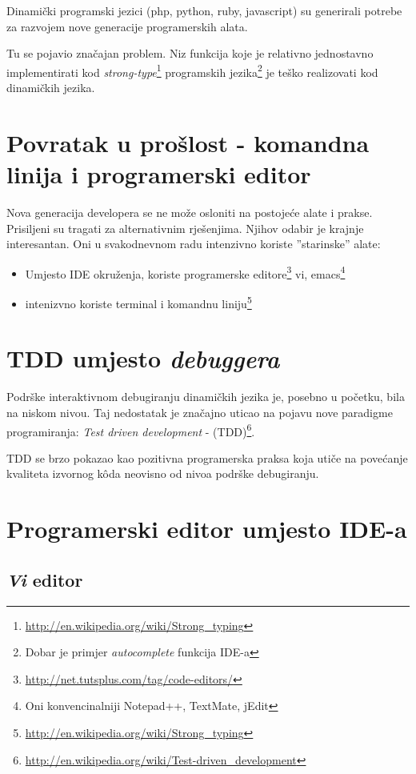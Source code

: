 \documentclass[times, utf8, seminar]{fit}
\begin{document}
Dinamički programski jezici (php, python, ruby, javascript) su generirali potrebe za razvojem nove generacije programerskih alata. 

Tu se pojavio značajan problem. Niz funkcija koje je relativno jednostavno implementirati kod \emph{strong-type}\footnote{\url{http://en.wikipedia.org/wiki/Strong_typing}} programskih jezika\footnote{Dobar je primjer \emph{autocomplete} funkcija IDE-a} je teško realizovati kod dinamičkih jezika.

\section{Povratak u prošlost - komandna linija i programerski editor}

Nova generacija developera se ne može osloniti na postojeće alate i prakse. Prisiljeni su tragati za alternativnim rješenjima. Njihov odabir je krajnje interesantan. Oni u svakodnevnom radu intenzivno koriste ''starinske'' alate:
\begin{itemize}
  \item Umjesto IDE okruženja, koriste programerske editore\footnote{\url{http://net.tutsplus.com/tag/code-editors/}} vi, emacs\footnote{Oni konvencinalniji Notepad++, TextMate, jEdit}
  \item intenizvno koriste terminal i komandnu liniju\footnote{\url{http://en.wikipedia.org/wiki/Strong_typing}} 
\end{itemize}

\section{TDD umjesto \emph{debuggera}}

Podrške interaktivnom debugiranju dinamičkih jezika je, posebno u početku, bila na niskom nivou. Taj nedostatak je značajno uticao na pojavu nove paradigme programiranja: \emph{Test driven development} - (TDD)\footnote{\url{http://en.wikipedia.org/wiki/Test-driven_development}}.

TDD se brzo pokazao kao pozitivna programerska praksa koja utiče na povećanje kvaliteta izvornog k\^oda neovisno od nivoa podrške debugiranju. 

\section{Programerski editor umjesto IDE-a}

\subsection{\emph{Vi} editor} 
\end{document}
